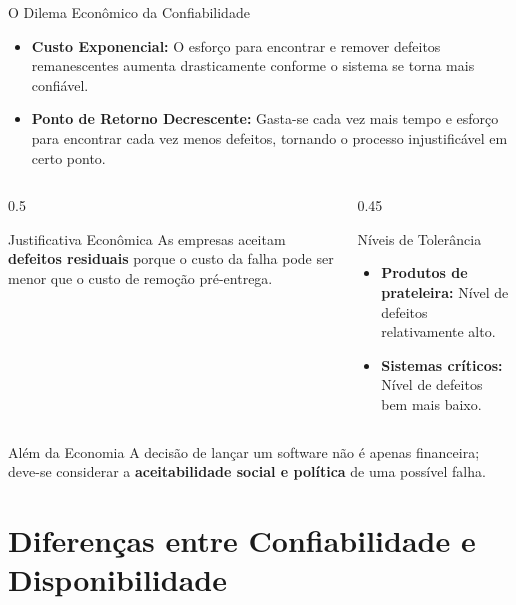 \documentclass[9pt]{beamer}
\begin{document}
\begin{frame}{O Dilema Econômico da Confiabilidade}
    \begin{itemize}
        \item \textbf{Custo Exponencial:} O esforço para encontrar e remover defeitos remanescentes aumenta drasticamente conforme o sistema se torna mais confiável.
        \item \textbf{Ponto de Retorno Decrescente:} Gasta-se cada vez mais tempo e esforço para encontrar cada vez menos defeitos, tornando o processo injustificável em certo ponto.
    \end{itemize}

    \begin{columns}[T]
        \begin{column}{0.5\textwidth}
            \begin{block}{Justificativa Econômica}
                \small
                As empresas aceitam \textbf{defeitos residuais} porque o custo da falha pode ser menor que o custo de remoção pré-entrega.
            \end{block}
        \end{column}
        \begin{column}{0.45\textwidth}
            \begin{block}{Níveis de Tolerância}
                \small
                \begin{itemize}
                    \item \textbf{Produtos de prateleira:} Nível de defeitos relativamente alto.
                    \item \textbf{Sistemas críticos:} Nível de defeitos bem mais baixo.
                \end{itemize}
            \end{block}
        \end{column}
    \end{columns}

    \vspace{0.3cm}
    \begin{alertblock}{Além da Economia}
        A decisão de lançar um software não é apenas financeira; deve-se considerar a \textbf{aceitabilidade social e política} de uma possível falha.
    \end{alertblock}
\end{frame}
\section{Diferenças entre Confiabilidade e Disponibilidade}  
\end{document}
